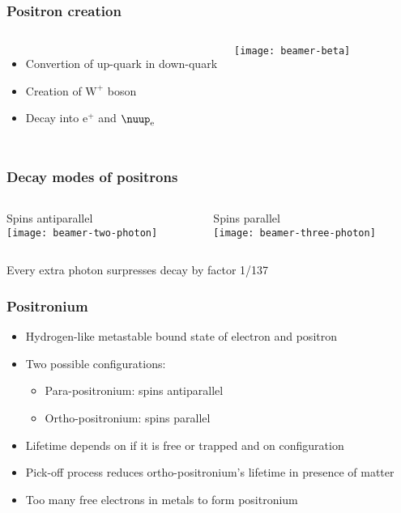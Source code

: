 \documentclass[english, fleqn]{beamer}
\begin{document}
\begin{frame}
    \frametitle{Positron creation}
    \begin{columns}[c]
        \begin{itemize}
            \item
                Convertion of up-quark in down-quark
            \item
                Creation of $\mathrm W^+$ boson
            \item
                Decay into $\mathrm e^+$ and $\nuup_\mathrm{e}$
        \end{itemize}
        \centering
        \texttt{[image: beamer-beta]}
    \end{columns}
\end{frame}

\begin{frame}
    \frametitle{Decay modes of positrons}

    \begin{columns}[T]
        \begin{column}{.5\textwidth}
            Spins antiparallel\\
            \vspace{1cm}
            \centering
            \texttt{[image: beamer-two-photon]}
        \end{column}
        \begin{column}{.5\textwidth}
            Spins parallel\\
            \centering
            \texttt{[image: beamer-three-photon]}
        \end{column}
    \end{columns}

    Every extra photon surpresses decay by factor 1/137
\end{frame}

\begin{frame}
    \frametitle{Positronium}
    \begin{itemize}
        \item
            Hydrogen-like metastable bound state of electron and positron
        \item
            Two possible configurations:
            \begin{itemize}
                \item
                    Para-positronium: spins antiparallel
                \item
                    Ortho-positronium: spins parallel
            \end{itemize}
        \item
            Lifetime depends on if it is free or trapped and on configuration 
        \item
            Pick-off process reduces ortho-positronium's lifetime in presence of matter
        \item
            Too many free electrons in metals to form positronium
    \end{itemize}
\end{frame}
\end{document}

